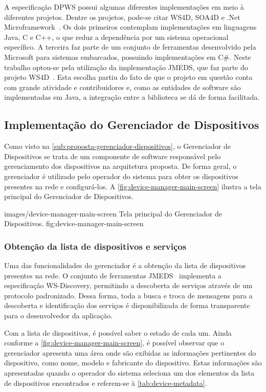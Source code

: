 A especificação \gls{DPWS} possui algumas diferentes implementações em meio à diferentes projetos.
Dentre os projetos, pode-se citar WS4D, SOA4D e .Net Microframework~\cite{marcelo2013analise}. Os
dois primeiros contemplam implementações em linguagens Java, C e C++, o que reduz a dependência por
um sistema operacional específico. A terceira faz parte de um conjunto de ferramentas desenvolvido
pela Microsoft para sistemas embarcados, possuindo implementações em C\#. Neste trabalho optou-se
pela utilização da implementação \gls{JMEDS}, que faz parte do projeto
WS4D~\cite{jmeds2013homepage}. Esta escolha partiu do fato de que o projeto em questão conta com
grande atividade e contribuidores e, como as entidades de software são implementadas em Java, a
integração entre a biblioteca se dá de forma facilitada.


\subsection{Implementação do Gerenciador de Dispositivos}

Como visto na \cref{sub:proposta-gerenciador-dispositivos}, o Gerenciador de Dispositivos se trata
de um componente de software responsável pelo gerenciamento dos dispositivos na arquitetura
proposta. De forma geral, o gerenciador é utilizado pelo operador do sistema para obter os
dispositivos presentes na rede e configurá-los. A \cref{fig:device-manager-main-screen} ilustra a
tela principal do Gerenciador de Dispositivos.

  {images/device-manager-main-screen}
  {Tela principal do Gerenciador de Dispositivos.}
  {fig:device-manager-main-screen}


\subsubsection{Obtenção da lista de dispositivos e serviços}

Uma das funcionalidades do gerenciador é a obtenção da lista de dispositivos presentes na rede. O
conjunto de ferramentas \gls{JMEDS}~\cite{jmeds2013homepage} implementa a especificação
{WS-Discovery}, permitindo a descoberta de serviços através de um protocolo padronizado. Dessa forma,
toda a busca e troca de mensagens para a descoberta e identificação dos serviços é disponibilizada
de forma transparente para o desenvolvedor da aplicação.

Com a lista de dispositivos, é possível saber o estado de cada um. Ainda conforme a
\cref{fig:device-manager-main-screen}, é possível observar que o gerenciador apresenta uma área onde
são exibidas as informações pertinentes do dispositivo, como nome, modelo e fabricante do
dispositivo. Estas informações são apresentadas quando o operador do sistema seleciona um dos
elementos da lista de dispositivos encontrados e referem-se à \cref{tab:device-metadata}.

